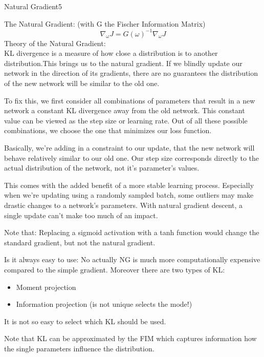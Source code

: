 \begin{questions}
\begin{question}[bonus]{Natural Gradient}{5}
\begin{answer}
The Natural Gradient: (with G the Fischer Information Matrix)
\begin{equation}
	\nabla_\omega J = G(\omega)^{-1} \nabla_\omega J
\end{equation}
Theory of the Natural Gradient:\\
KL divergence is a measure of how close a distribution is to another distribution.This brings us to the natural gradient. If we blindly update our network in the direction of its gradients, there are no guarantees the distribution of the new network will be similar to the old one.

To fix this, we first consider all combinations of parameters that result in a new network a constant KL divergence away from the old network. This constant value can be viewed as the step size or learning rate. Out of all these possible combinations, we choose the one that minimizes our loss function.

Basically, we're adding in a constraint to our update, that the new network will behave relatively similar to our old one. Our step size corresponds directly to the actual distribution of the network, not it's parameter's values.

This comes with the added benefit of a more stable learning process. Especially when we're updating using a randomly sampled batch, some outliers may make drastic changes to a network's parameters. With natural gradient descent, a single update can't make too much of an impact. 
	
Note that: Replacing a sigmoid activation with a tanh function would change the standard gradient, but not the natural gradient. 

Is it always easy to use:
No actually NG is much more computationally expensive compared to the simple gradient. Moreover there are two types of KL:
\begin{itemize}
	\item Moment projection
	\item Information projection (is not unique selects the mode!)
\end{itemize}

It is not so easy to select which KL should be used.

Note that KL can be approximated by the FIM which captures information how the single parameters influence the distribution.


\end{answer}
\end{question}

\end{questions}